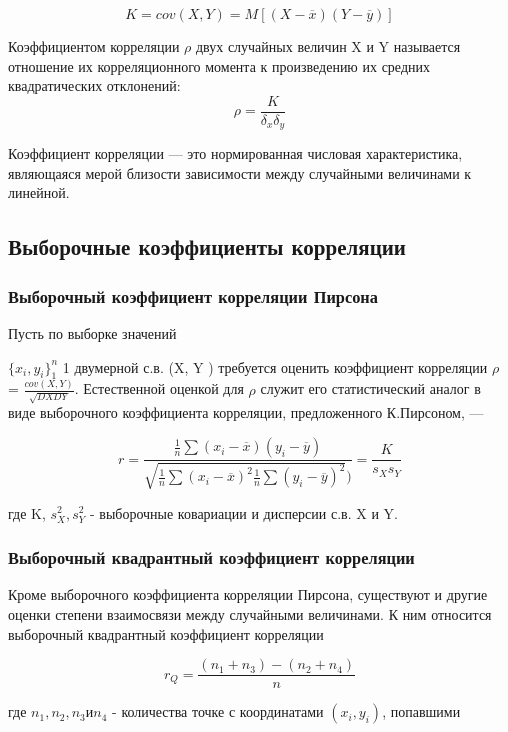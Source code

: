 \documentclass[a4]{article}
\begin{document}
			$$K = cov(X, Y) = M[(X - \overline{x})(Y - \overline{y})]$$
			
			Коэффициентом корреляции $\rho$ двух случайных величин X и Y называется отношение их корреляционного момента к произведению их средних квадратических отклонений:
			$$\rho = \frac{K}{\delta_x\delta_y}$$

			
			Коэффициент корреляции — это нормированная числовая характеристика, являющаяся мерой близости зависимости между случайными величинами
			к линейной.
			
			\subsection{Выборочные коэффициенты корреляции}
				\subsubsection{Выборочный коэффициент корреляции Пирсона}
					
Пусть по выборке значений 
					

					
$\{{x_i, y_i}\}^n_1$ 1 двумерной с.в. (X, Y ) требуется оценить коэффициент корреляции $\rho$ = $\frac{cov(X, Y)}{\sqrt{DX DY}}$. Естественной оценкой для $\rho$ служит его статистический аналог в виде выборочного коэффициента корреляции, предложенного К.Пирсоном, —
					

					
$$r = \frac{\frac{1}{n} \sum(x_i - \overline{x})(y_i - \overline{y})}{\sqrt{\frac{1}{n} \sum (x_i - \overline{x})^2 \frac{1}{n} \sum(y_i - \overline{y})^2})} = \frac{K}{s_X s_Y}$$
					
где K, $s^2_X, s^2_Y$ - выборочные ковариации и дисперсии с.в. X и Y.
					

					
\subsubsection{Выборочный квадрантный коэффициент корреляции}
					
	Кроме выборочного коэффициента корреляции Пирсона, существуют и другие оценки степени взаимосвязи между случайными величинами. К ним относится выборочный квадрантный коэффициент корреляции
					
	$$r_Q = \frac{(n_1 + n_3) - (n_2 + n_4)}{n}$$
					
	
					
	где $n_1, n_2, n_3 и n_4$ - количества точке с координатами $(x_i, y_i)$, попавшими
					
\end{document}
